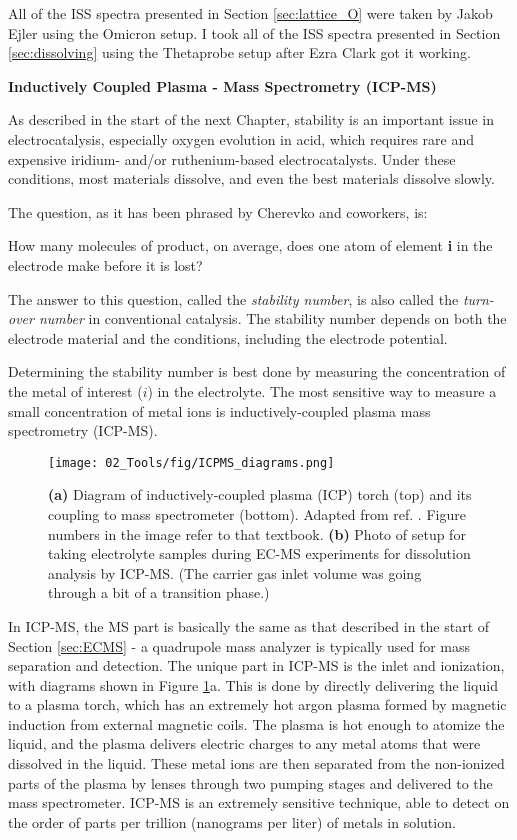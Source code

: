 All of the ISS spectra presented in Section \ref{sec:lattice_O} were taken by Jakob Ejler using the Omicron setup. I took all of the ISS spectra presented in Section \ref{sec:dissolving} using the Thetaprobe setup after Ezra Clark got it working.

\vspace{5mm}
\textbf{Inductively Coupled Plasma - Mass Spectrometry (ICP-MS)}

As described in the start of the next Chapter, stability is an important issue in electrocatalysis, especially oxygen evolution in acid, which requires rare and expensive iridium- and/or ruthenium-based electrocatalysts. Under these conditions, most materials dissolve, and even the best materials dissolve slowly.

The question, as it has been phrased by Cherevko and coworkers\cite{Geiger2018}, is:
\begin{question}
	How many molecules of product, on average, does one atom of element \textbf{i} in the electrode make before it is lost?
\end{question}
The answer to this question, called the \textit{stability number}, is also called the \textit{turn-over number} in conventional catalysis. The stability number depends on both the electrode material and the conditions, including the electrode potential.

Determining the stability number is best done by measuring the concentration of the metal of interest ($i$) in the electrolyte. The most sensitive way to measure a small concentration of metal ions is inductively-coupled plasma mass spectrometry (ICP-MS)\cite{Harris2010, Frydendal2014}.
\begin{figure}[t]
	\centering
	\texttt{[image: 02\_Tools/fig/ICPMS\_diagrams.png]}
	\caption{\textbf{(a)} Diagram of inductively-coupled plasma (ICP) torch (top) and its coupling to mass spectrometer (bottom). Adapted from ref. . Figure numbers in the image refer to that textbook. \textbf{(b)} Photo of setup for taking electrolyte samples during EC-MS experiments for dissolution analysis by ICP-MS. (The carrier gas inlet volume was going through a bit of a transition phase.) }
	\label{fig:ICPMS}
\end{figure}
In ICP-MS, the MS part is basically the same as that described in the start of Section \ref{sec:ECMS} - a quadrupole mass analyzer is typically used for mass separation and detection. The unique part in ICP-MS is the inlet and ionization\cite{Gross2007}, with diagrams shown in Figure \ref{fig:ICPMS}a. This is done by directly delivering the liquid to a plasma torch, which has an extremely hot argon plasma formed by magnetic induction from external magnetic coils. The plasma is hot enough to atomize the liquid, and the plasma delivers electric charges to any metal atoms that were dissolved in the liquid. These metal ions are then separated from the non-ionized parts of the plasma by lenses through two pumping stages and delivered to the mass spectrometer. ICP-MS is an extremely sensitive technique, able to detect on the order of parts per trillion (nanograms per liter) of metals in solution.

